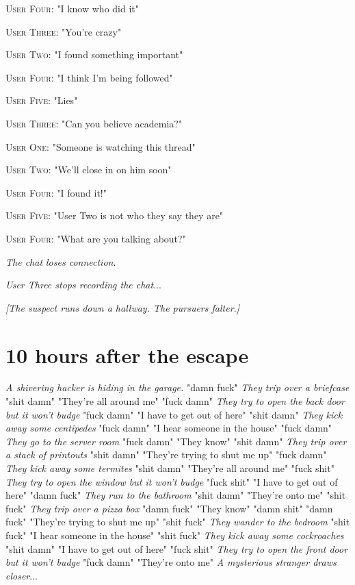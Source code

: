 \documentclass{report}
\begin{document}
\textsc{User Four}: "I know who did it" 

\textsc{User Three}: "You're crazy" 

\textsc{User Two}: "I found something important" 

\textsc{User Four}: "I think I'm being followed" 

\textsc{User Five}: "Lies" 

\textsc{User Three}: "Can you believe academia?" 

\textsc{User One}: "Someone is watching this thread" 

\textsc{User Two}: "We'll close in on him soon" 

\textsc{User Four}: "I found it!" 

\textsc{User Five}: "User Two is not who they say they are" 

\textsc{User Four}: "What are you talking about?" 

\textit{The chat loses connection}. 

\textit{User Three stops recording the chat}...

\textit{[The suspect runs down a hallway. The pursuers falter.]}


\section*{10 \small{hours after the escape}}

\textit{A shivering hacker is hiding in the garage.} "damn fuck" \textit{They trip over a briefcase} "shit damn" "They're all around me" "fuck damn" \textit{They try to open the back door but it won't budge} "fuck damn" "I have to get out of here" "shit damn" \textit{They kick away some centipedes} "fuck damn" "I hear someone in the house" "fuck damn" \textit{They go to the server room} "fuck damn" "They know" "shit damn" \textit{They trip over a stack of printouts} "shit damn" "They're trying to shut me up" "fuck damn" \textit{They kick away some termites} "shit damn" "They're all around me" "fuck shit" \textit{They try to open the window but it won't budge} "fuck shit" "I have to get out of here" "damn fuck" \textit{They run to the bathroom} "shit damn" "They're onto me" "shit fuck" \textit{They trip over a pizza box} "damn fuck" "They know" "damn shit" \textit{} "damn fuck" "They're trying to shut me up" "shit fuck" \textit{They wander to the bedroom} "shit fuck" "I hear someone in the house" "shit fuck" \textit{They kick away some cockroaches} "shit damn" "I have to get out of here" "fuck shit" \textit{They try to open the front door but it won't budge} "fuck damn" "They're onto me" \textit{A mysterious stranger draws closer}...
\end{document}
